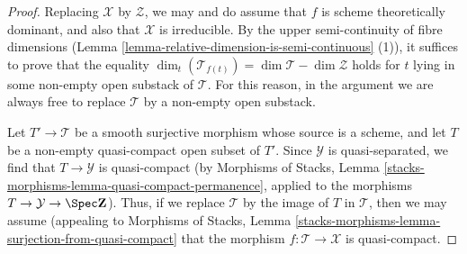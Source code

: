 \begin{proof}
Replacing $\mathcal{X}$ by $\mathcal{Z}$, we may and do assume that $f$ is
scheme theoretically dominant,
and also that $\mathcal{X}$ is irreducible.
By the upper semi-continuity of fibre dimensions
(Lemma \ref{lemma-relative-dimension-is-semi-continuous} (1)),
it suffices to prove that the equality
$\dim_t( \mathcal{T}_{f(t)}) =\dim \mathcal{T}  - \dim \mathcal{Z}$
holds for $t$ lying in
some non-empty open substack of $\mathcal{T}$.
For this reason, in the argument we are always free
to replace $\mathcal{T}$ by a non-empty open substack.

\medskip\noindent
Let $T' \to \mathcal{T}$ be a smooth surjective morphism whose source
is a scheme, and let $T$ be a non-empty quasi-compact open subset
of $T'$.  Since $\mathcal{Y}$ is quasi-separated, we find
that $T \to  \mathcal{Y}$ is quasi-compact
(by Morphisms of Stacks, Lemma
\ref{stacks-morphisms-lemma-quasi-compact-permanence}, applied to the morphisms
$T \to \mathcal{Y} \to \Spec \mathbf{Z}$).
Thus, if we replace $\mathcal{T}$ by the image of $T$ in $\mathcal{T}$,
then we may assume (appealing to
Morphisms of Stacks, Lemma
\ref{stacks-morphisms-lemma-surjection-from-quasi-compact}
that the morphism $f:\mathcal{T} \to \mathcal{X}$ is quasi-compact.


\end{proof}
